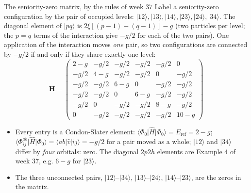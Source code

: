 \documentclass[aspectratio=169,10pt]{beamer}
\newcommand{\ket}[1]{\vert #1\rangle}
\newcommand{\element}[3]{\langle #1\vert #2\vert #3\rangle}
\begin{document}
\begin{frame}{The seniority-zero matrix, by the rules of week 37}
  \small
  Label a seniority-zero configuration by the pair of occupied levels: $\ket{12},\ket{13},\ket{14},\ket{23},\ket{24},\ket{34}$. The diagonal element of $\ket{pq}$ is $2\xi[(p-1)+(q-1)]-g$ (two particles per level; the $p=q$ terms of the interaction give $-g/2$ for each of the two pairs). One application of the interaction moves \emph{one} pair, so two configurations are connected by $-g/2$ if and only if they share exactly one level:
  \[
    \bm{H}=
    \begin{pmatrix}
      2-g & -g/2 & -g/2 & -g/2 & -g/2 & 0\\
      -g/2 & 4-g & -g/2 & -g/2 & 0 & -g/2\\
      -g/2 & -g/2 & 6-g & 0 & -g/2 & -g/2\\
      -g/2 & -g/2 & 0 & 6-g & -g/2 & -g/2\\
      -g/2 & 0 & -g/2 & -g/2 & 8-g & -g/2\\
      0 & -g/2 & -g/2 & -g/2 & -g/2 & 10-g
    \end{pmatrix}
  \]
  \begin{itemize}
    \item Every entry is a Condon-Slater element: $\element{\Phi_0}{\hat{H}}{\Phi_0}=E_{\mathrm{ref}}=2-g$; $\element{\Phi_{ij}^{ab}}{\hat{H}}{\Phi_0}=\element{ab}{\hat{v}}{ij}=-g/2$ for a pair moved as a whole; $\ket{12}$ and $\ket{34}$ differ by \emph{four} orbitals: zero. The diagonal $2p2h$ elements are Example 4 of week 37, e.g. $6-g$ for $\ket{23}$.
    \item The three unconnected pairs, $\ket{12}$--$\ket{34}$, $\ket{13}$--$\ket{24}$, $\ket{14}$--$\ket{23}$, are the zeros in the matrix.
  \end{itemize}
\end{frame}
\end{document}
